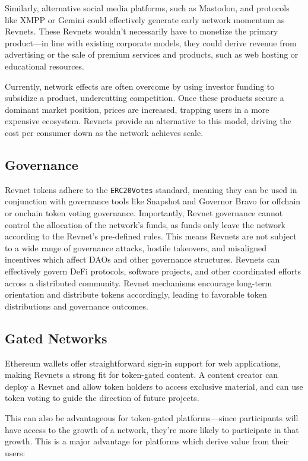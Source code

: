 \documentclass{article}
\begin{document}
Similarly, alternative social media platforms, such as Mastodon, and protocols like XMPP or Gemini could effectively generate early network momentum as Revnets. These Revnets wouldn't necessarily have to monetize the primary product---in line with existing corporate models, they could derive revenue from advertising or the sale of premium services and products, such as web hosting or educational resources. 

Currently, network effects are often overcome by using investor funding to subsidize a product, undercutting competition. Once these products secure a dominant market position, prices are increased, trapping users in a more expensive ecosystem. Revnets provide an alternative to this model, driving the cost per consumer down as the network achieves scale.

\subsection{Governance}

Revnet tokens adhere to the \texttt{ERC20Votes} standard, meaning they can be used in conjunction with governance tools like Snapshot and Governor Bravo for offchain or onchain token voting governance. Importantly, Revnet governance cannot control the allocation of the network's funds, as funds only leave the network according to the Revnet's pre-defined rules. This means Revnets are not subject to a wide range of governance attacks, hostile takeovers, and misaligned incentives which affect DAOs and other governance structures. Revnets can effectively govern DeFi protocols, software projects, and other coordinated efforts across a distributed community. Revnet mechanisms encourage long-term orientation and distribute tokens accordingly, leading to favorable token distributions and governance outcomes.

\subsection{Gated Networks}

Ethereum wallets offer straightforward sign-in support for web applications, making Revnets a strong fit for token-gated content. A content creator can deploy a Revnet and allow token holders to access exclusive material, and can use token voting to guide the direction of future projects.

This can also be advantageous for token-gated platforms---since participants will have access to the growth of a network, they're more likely to participate in that growth. This is a major advantage for platforms which derive value from their users:
\end{document}
